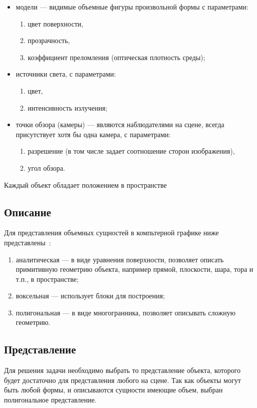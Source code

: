 \begin{itemize}
	\item модели --- видимые объемные фигуры произвольной формы с параметрами:
	\begin{enumerate}
		\item цвет поверхности,
		\item прозрачность,
		\item коэффициент преломления (оптическая плотность среды);
	\end{enumerate}
	\item источники света, с параметрами: 
	\begin{enumerate}
		\item цвет,
		\item интенсивность излучения;
	\end{enumerate}
	\item точки обзора (камеры) --- являются наблюдателями на сцене, всегда присутствует хотя бы одна камера, с параметрами:
	\begin{enumerate}
		\item разрешение (в том числе задает соотношение сторон изображения),
		\item угол обзора.
	\end{enumerate}
\end{itemize}

Каждый объект обладает положением в пространстве


\subsection{Описание}
Для представления объемных сущностей в компьтерной графике ниже представлены~\cite[с.с.~341--350]{cg-priciples}:
\begin{enumerate}
	\item аналитическая --- в виде уравнения поверхности, позволяет описать примитивную геометрию объекта, например прямой, плоскости, шара, тора и т.п., в пространстве;
	\item воксельная --- использует блоки для построения;
	\item полигональная --- в виде многогранника, позволяет описывать сложную геометрию.
\end{enumerate}

\subsection{Представление}

Для решения задачи необходимо выбрать то представление объекта, которого будет достаточно для представления любого на сцене. Так как объекты могут быть любой формы, и описываются сущности имеющие объем, выбран полигональное представление.


